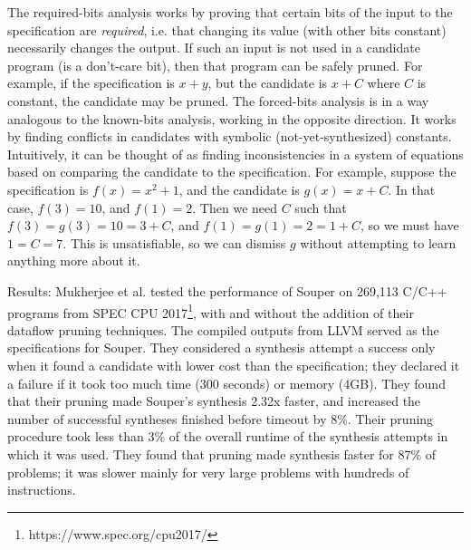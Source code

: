\documentclass[12pt,twoside]{reedthesis}
\begin{document}
            The required-bits analysis works by proving that certain bits of the input to the specification are \textit{required}, i.e. that changing its value (with other bits constant) necessarily changes the output.
                If such an input is not used in a candidate program (is a don't-care bit), then that program can be safely pruned.
                    For example, if the specification is $x + y$, but the candidate is $x + C$ where $C$ is constant, the candidate may be pruned.
            The forced-bits analysis is in a way analogous to the known-bits analysis, working in the opposite direction.
                It works by finding conflicts in candidates with symbolic (not-yet-synthesized) constants.
                Intuitively, it can be thought of as finding inconsistencies in a system of equations based on comparing the candidate to the specification.
                For example, suppose the specification is $f(x) = x^2 + 1$, and the candidate is $g(x) = x + C$. In that case, $f(3) = 10$, and $f(1) = 2$. Then we need $C$ such that $f(3) = g(3) = 10 = 3 + C$, and $f(1) = g(1) = 2 = 1 + C$, so we must have $1 = C = 7$. This is unsatisfiable, so we can dismiss $g$ without attempting to learn anything more about it.
            
            Results: Mukherjee et al. tested the performance of Souper on 269,113 C/C++ programs from SPEC CPU 2017\footnote{https://www.spec.org/cpu2017/}, with and without the addition of their dataflow pruning techniques.
            The compiled outputs from LLVM served as the specifications for Souper.
            They considered a synthesis attempt a success only when it found a candidate with lower cost than the specification;
            they declared it a failure if it took too much time (300 seconds) or memory (4GB).
            They found that their pruning made Souper's synthesis 2.32x faster, and increased the number of successful syntheses finished before timeout by 8\%.
            Their pruning procedure took less than 3\% of the overall runtime of the synthesis attempts in which it was used.
            They found that pruning made synthesis faster for 87\% of problems; it was slower mainly for very large problems with hundreds of instructions.

\end{document}
